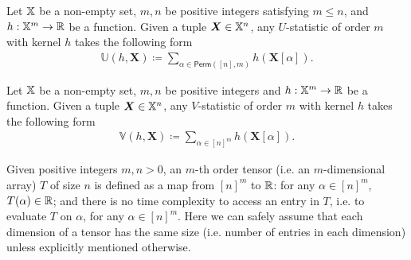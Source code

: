 \documentclass[letterpaper,11pt]{article}
\newcommand{\Zhang}[1]{{\color{blue}{Zhang: #1}}}
\newcommand{\ustat}{\mathbb{U}}
\newcommand{\vstat}{\mathbb{V}}
\newcommand{\ustatp}[2]{\ustat(#1,#2)}
\newcommand{\vstatp}[2]{\vstat(#1,#2)}
\newcommand{\perm}[1]{\mathsf{Perm}(#1)}
\begin{document}
\begin{bibunit}[plainnat]
\begin{definition}[$U$-Statistic]\label{def:u_stat}
Let ${\mathbb{X}}$ be a non-empty set, $m, n$ be positive integers satisfying $m \leq n$, and $h: {\mathbb{X}}^{m} \rightarrow {\mathbb{R}}$ be a function. Given a tuple $\bm{X} \in {\mathbb{X}}^n$, any $U$-statistic of order $m$ with kernel $h$ takes the following form 
    \begin{align*}
        \ustatp{h}{\bm{X}} \coloneqq \sum_{\alpha \in \perm{[n],m}} h(\bm{X}[\alpha]). 
    \end{align*}
\end{definition}

\begin{definition}[$V$-Statistic]\label{def:v_stat}
Let ${\mathbb{X}}$ be a non-empty set, $m, n$ be positive integers and $h: {\mathbb{X}}^{m} \rightarrow {\mathbb{R}}$ be a function. Given a tuple $\bm{X} \in {\mathbb{X}}^n$, any $V$-statistic of order $m$ with kernel $h$ takes the following form 
    \begin{align*}
        \vstatp{h}{\bm{X}} \coloneqq \sum_{\alpha \in [n]^m} h(\bm{X}[\alpha]). 
    \end{align*} 
\end{definition}

\begin{definition}[Tensor]
\label{def:tensors}
Given positive integers $m, n > 0$, an $m$-th order tensor (i.e. an $m$-dimensional array) $T$ of size $n$ is defined as a map from $[n]^m$ to ${\mathbb{R}}$: for any $\alpha \in [n]^{m}$, $T (\alpha) \in {\mathbb{R}}$; and there is no time complexity to access an entry in $T$, i.e. to evaluate $T$ on $\alpha$, for any $\alpha \in [n]^{m}$. Here we can safely assume that each dimension of a tensor has the same size (i.e. number of entries in each dimension) unless explicitly mentioned otherwise.
\end{definition}


\end{bibunit}
\end{document}
